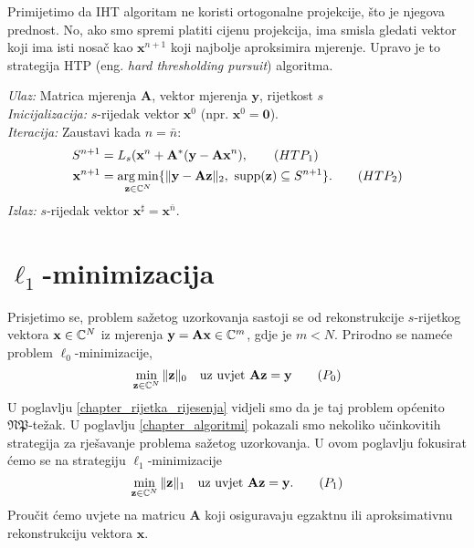 \documentclass[a4paper,twoside,12pt]{memoir} %
\newcommand{\vect}[1]{\mathbf{#1}}
\renewcommand{\vec}{\vect}
\newcommand{\supp}{\text{\normalfont{supp}}}
\newcommand{\norm}[1]{\|{#1}\|}
\DeclareMathOperator*{\argmin}{arg\,min}
\newenvironment{alg}[1]
{
    \bigskip
    \begin{tcolorbox}[arc=0mm,boxrule=1.2pt,colframe=black,colback=white,detach title, before upper={\medskip\begin{center}\textbf{#1}\end{center}\hline\newline\medskip},frame hidden]
    \medskip
}
{
    \medskip
\end{tcolorbox}
    \bigskip
}
\begin{document}
Primijetimo da IHT algoritam ne koristi ortogonalne projekcije, \v{s}to je njegova prednost. No, ako smo spremi platiti cijenu projekcija, ima smisla gledati vektor koji ima isti nosa\v{c} kao $\vec x^{n+1}$ koji najbolje aproksimira mjerenje. Upravo je to strategija HTP (eng. \textit{hard thresholding pursuit}) algoritma.

\begin{alg}{HTP}
    \textit{Ulaz:} Matrica mjerenja $\vec A$, vektor mjerenja $\vec y$, rijetkost $s$ \\
    \textit{Inicijalizacija:} $s$-rijedak vektor $\vec x^0$ (npr. $\vec x^0 = \vec 0$).\\
    \textit{Iteracija:} Zaustavi kada $n = \bar{n}$:
        \begin{align*}
            S^{n+1} &= L_s(\vec x^n + \vec A^* (\vec y - \vec{Ax}^n),\tag{$HTP_1$}\label{htp_1}\\
            \vec x^{n+1} &= \argmin_{\vec z \in \C^N}\{ \norm{\vec y - \vec{Az}}_2,\ \supp(\vec z) \subseteq S^{n+1} \}.\tag{$HTP_2$}\label{htp_2}
        \end{align*}
        \textit{Izlaz:} $s$-rijedak vektor $\vec x^{\sharp}=\vec x^{\bar n}$.
\end{alg}





\chapter[$\ell_1$-minimizacija][$\ell_1$-minimizacija]{$\ell_1$-minimizacija}
Prisjetimo se, problem sa\v{z}etog uzorkovanja sastoji se od rekonstrukcije $s$-rijetkog vektora $\vec x \in \C^N$ iz mjerenja $\vec y = \vec{Ax} \in \C^m$, gdje je $m < N$. Prirodno se name\'ce problem $\ell_0$-minimizacije,
\noindent
\begin{equation}
\min_{\vec z \in \C^N} \norm{\vec z}_0\quad \text{uz uvjet }\vec{Az} = \vec{y}\tag{$P_0$}
\end{equation}
U poglavlju \eqref{chapter_rijetka_rijesenja} vidjeli smo da je taj problem op\'cenito $\mathfrak{NP}$-te\v{z}ak. U poglavlju \eqref{chapter_algoritmi} pokazali smo nekoliko u\v{c}inkovitih strategija za rje\v{s}avanje problema sa\v{z}etog uzorkovanja. U ovom poglavlju fokusirat \'cemo se na strategiju $\ell_1$-minimizacije
\begin{equation}
    \min_{\vec z \in \C^N} \norm{\vec z}_1 \quad \text{uz uvjet }\vec{Az}=\vec y.\tag{$P_1$}
\end{equation}
Prou\v{c}it \'{c}emo uvjete na matricu $\vec A$ koji osiguravaju egzaktnu ili aproksimativnu rekonstrukciju vektora $\vec x$.
\end{document}
